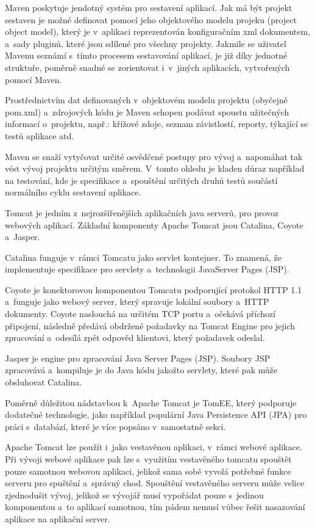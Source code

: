 \documentclass[twoside, 12pt]{article}
\begin{document}
{%
Maven poskytuje jendotný systém pro sestavení aplikací.
Jak má být projekt sestaven je možné definovat pomocí
jeho objektového modelu projeku (project object model),
který je v~aplikaci reprezentován konfiguračním xml dokumentem,
a~sady pluginů, které jsou sdílené pro všechny projekty.
Jakmile se uživatel Mavenu seznámí s~tímto procesem sestavování aplikací,
je již díky jednotné struktuře, poměrně snadné se zorientovat i~v~jiných aplikacích,
vytvořených pomocí Maven.

Prostřednictvím dat definovaných v~objektovém modelu projektu (obyčejně pom.xml)
a~zdrojových kódu je Maven schopen podávat spoustu užitečných informací o~projektu,
např.: křížové zdoje, seznam závistlostí, reporty, týkající se testů aplikace atd.

Maven se snaží vytyčovat určité osvědčené postupy pro vývoj
a~napomáhat tak vést vývoj projektu určitým směrem.
V~tomto ohledu je kladen důraz například na testování,
kde je specifikace a~spouštění určitých druhů testů
součástí normálního cyklu sestavení aplikace.
\cite{maven}


Tomcat je jedním z~nejrozšířenějších aplikačních java serverů,
pro provoz webových aplikací.
Základní komponenty Apache Tomcat jsou Catalina, Coyote a~Jasper.

Catalina funguje v~rámci Tomcatu jako servlet kontejner.
To znamená, že implementuje specifikace pro servlety a~technologii JavaServer Pages (JSP).

Coyote je konektorovou komponentou Tomcatu podporující protokol HTTP 1.1
a~funguje jako webový server, který spravuje lokální soubory a~HTTP dokumenty.
Coyote naslouchá na určitém TCP portu a~očekává příchozí připojení,
následně předává obdržené požadavky na Tomcat Engine pro jejich zpracování
a~odesílá zpět odpověd klientovi, který požadavek odeslal.

Jasper je engine pro zpracování Java Server Pages (JSP).
Soubory JSP zpracovává a~kompiluje je do Java kódu jakožto servlety,
které pak může obsluhovat Catalina.
\cite{tomcatWikipedia}

Poměrně důležitou nádstavbou k~Apache Tomcat je TomEE,
který podporuje dodatečné technologie,
jako například populární Java Persistence API (JPA) pro práci s~databází,
které je více popsáno v~samostatně sekci.

Apache Tomcat lze použít i~jako vestavěnou aplikaci, v~rámci webové aplikace.
Při vývoji webové aplikace pak lze s~využitím vestavěného tomcatu
spouštět pouze samotnou webovou aplikaci, jelikož sama sobě vyvolá
potřebné funkce serveru pro spuštění a~správný chod.
Spouštění vestavěného serveru může velice zjednodušit vývoj,
jelikož se vývojář musí vypořádat pouze s~jedinou komponentou a~to aplikací samotnou,
tím pádem nemusí vůbec řešit nasazování aplikace na aplikační server.
\cite{javaWorld}

}
\end{document}
